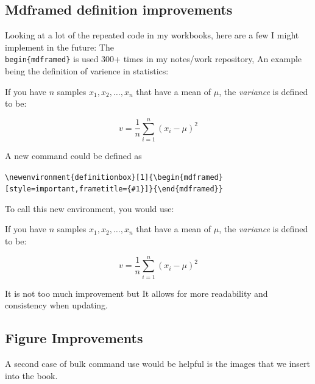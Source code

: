 \documentclass{article} %
\begin{document}
\subsection{Mdframed definition improvements}
Looking at a lot of the repeated code in my workbooks, here are a few I might implement in the future:
The \texttt{\\begin\{mdframed\}} is used 300+ times in my notes/work repository, 
An example being the definition of varience in statistics:

    \begin{mdframed}[style=important, frametitle={Definition of Variance}]

    If you have $n$ samples $x_1, x_2, \ldots, x_n$ that have a mean of $\mu$, the \textit{variance} is defined to be:

    $$v = \frac{1}{n}\sum_{i = 1}^{n} \left(x_i - \mu\right)^2$$
    \end{mdframed}

    A new command could be defined as 
    \newenvironment{definitionbox}[1]{\begin{mdframed}[style=important,frametitle={#1}]}{\end{mdframed}}

    \texttt{\textbackslash newenvironment\{definitionbox\}[1]\{\textbackslash begin\{mdframed\}[style=important,frametitle=\{\#1\}]\}\{\textbackslash end\{mdframed\}\}}

    To call this new environment, you would use:
    \begin{definitionbox}{Definition of Mean}
    If you have $n$ samples $x_1, x_2, \ldots, x_n$ that have a mean of $\mu$, the \textit{variance} is defined to be:

    $$v = \frac{1}{n}\sum_{i = 1}^{n} \left(x_i - \mu\right)^2$$
    \end{definitionbox}

    It is not too much improvement but It allows for more readability and consistency when updating. 

    \subsection{Figure Improvements}
    A second case of bulk command use would be helpful is the images that we insert into the book.
\end{document}
